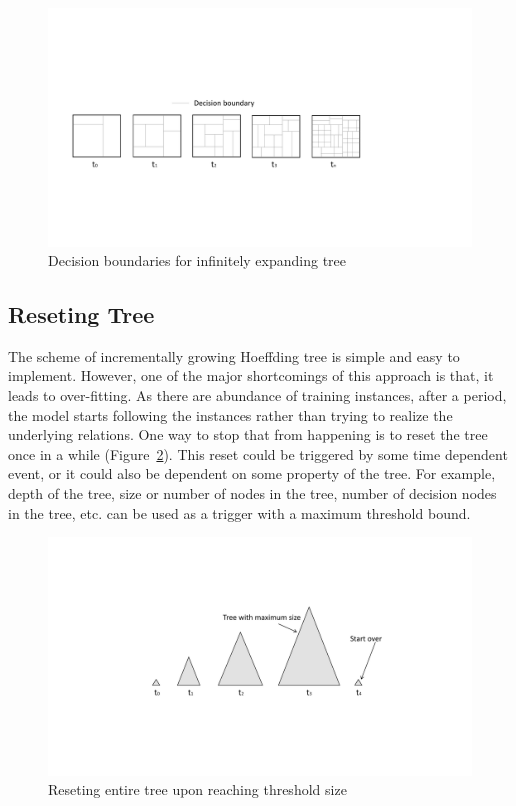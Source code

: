 \begin{figure}[htbp]
    \begin{center}
        \includegraphics[width=14.0cm]{figs/infgrowdb.pdf}
        \caption{Decision boundaries for infinitely expanding tree}
        \label{fig:algo:infgrowdb}
    \end{center}
\end{figure}


\subsection{Reseting Tree}
The scheme of incrementally growing Hoeffding tree is simple and easy to implement. However, one of the major shortcomings of this approach is that, it leads to over-fitting. As there are abundance of training instances, after a period, the model starts following the instances rather than trying to realize the underlying relations. One way to stop that from happening is to reset the tree once in a while (Figure~\ref{fig:algo:reset}). This reset could be triggered by some time dependent event, or it could also be dependent on some property of the tree. For example, depth of the tree, size or number of nodes in the tree, number of decision nodes in the tree, etc. can be used as a trigger with a maximum threshold bound.

\begin{figure}[htbp]
    \begin{center}
        \includegraphics[width=12.0cm]{figs/reset.pdf}
        \caption{Reseting entire tree upon reaching threshold size}
        \label{fig:algo:reset}
    \end{center}
\end{figure}


